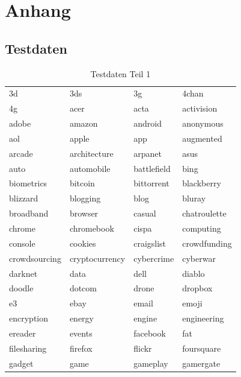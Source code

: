 \documentclass[12pt,a4paper]{report}
\begin{document}
\newpage



\listoftables
\listoffigures 




\chapter{Anhang}
	\section{Testdaten}
	\label{sec:Testdaten}
\begin{table}[ht]
\caption{Testdaten Teil 1}
\begin{tabular}{l|l|l|l}\\
3d & 3ds & 3g & 4chan\\
4g & acer & acta & activision\\
adobe & amazon & android & anonymous\\
aol & apple & app & augmented\\
arcade & architecture & arpanet & asus\\
auto & automobile & battlefield & bing\\
biometrics & bitcoin & bittorrent & blackberry\\
blizzard & blogging & blog & bluray\\
broadband & browser & casual & chatroulette\\
chrome & chromebook & cispa & computing\\
console & cookies & craigslist & crowdfunding\\
crowdsourcing & cryptocurrency & cybercrime & cyberwar\\
darknet & data & dell & diablo\\
doodle & dotcom & drone & dropbox\\
e3 & ebay & email & emoji\\
encryption & energy & engine & engineering\\
ereader & events & facebook & fat\\
filesharing & firefox & flickr & foursquare\\
gadget & game & gameplay & gamergate\\

\end{tabular}
\end{table}
\end{document}

